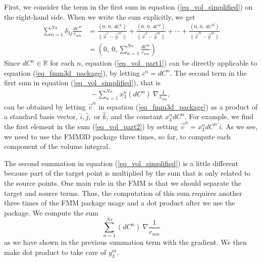 \par
First, we consider the term in the first sum in equation (\ref{eq_vol_simplified}) on the right-hand side. When we write the sum explicitly, we get
\begin{align}
	\sum_{n=1}^{Ns}
	\delta_{3j} \frac{d C^n}{ r_{nm}} 
	 & =  \frac{(0,\ 0, \ dC^1)}{ \|\vec{x}^1 - \vec{y}^m \|} 
	 +  \frac{(0,\ 0, \ d C^2)}{ \|\vec{x}^2 - \vec{y}^m \|} 
	 +  \cdots
	 +  \frac{(0,\ 0, \ dC^N)}{ \|\vec{x}^N - \vec{y}^m \|}
	 \nonumber \\
	 & = \left(0,\ 0, \sum_{n=1}^{Ns} \frac{dC^n}{ r_{nm}} \right)
\label{eq_vol_part1}
\end{align}
Since $dC^n \in \mathbb{R}$ for each $n$,
 equation (\ref{eq_vol_part1}) can be directly applicable to equation (\ref{eq_fmm3d_package}), by letting $c^n = d C^n$.
The second term in the first sum in equation (\ref{eq_vol_simplified}), that is
\begin{align}
		-\sum_{n=1}^{Ns} 
			x_3^n \left(d{C}^n \right)
			      \
			\nabla
				\frac{1}{r_{nm}},
\label{eq_vol_part2}
\end{align}
can be obtained by letting $\vec{v}^n$ in equation (\ref{eq_fmm3d_package}) as a product of a standard basis vector, $\hat{i}, \hat{j}, $ or $\hat{k}$, and the constant $x_3^n d  C^n$. For example, we find the first element in the sum (\ref{eq_vol_part2}) by setting $\vec{v}^n = x_3^n dC^n \ \hat{i}$. As we see, we need to use the FMM3D package three times, so far, to compute each component of the volume integral. 
\par
The second summation in equation (\ref{eq_vol_simplified}) is a little different because part of the target point is multiplied by the sum that is only related to the source points. One main rule in the FMM is that we should separate the target and source terms. Thus, the computation of this sum requires another three times of the FMM package usage and a dot product after we use the package. 
We compute the sum
\[
			 \sum_{n=1}^{Ns}  
			 \left( d{C}^n \right)  \
			\nabla
				\frac{1}{r_{nm}}
\]
as we have shown in the previous summation term with the gradient. We then make dot product to take care of $y_3^m$. 
